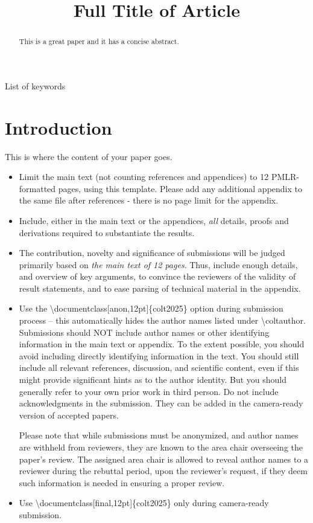 \documentclass[anon,12pt]{colt2025} %
\title[Short Title]{Full Title of Article}
\begin{document}
\maketitle

\begin{abstract}%
  This is a great paper and it has a concise abstract.%
\end{abstract}

\begin{keywords}%
  List of keywords%
\end{keywords}

\section{Introduction}

This is where the content of your paper goes.
\begin{itemize}
  \item Limit the main text (not counting references and appendices) to 12 PMLR-formatted pages, using this template. Please add any additional appendix to the same file after references - there is no page limit for the appendix.
  \item Include, either in the main text or the appendices, \emph{all} details, proofs and derivations required to substantiate the results.
  \item The contribution, novelty and significance of submissions will be judged primarily based on
\textit{the main text of 12 pages}. Thus, include enough details, and overview of key arguments, 
to convince the reviewers of the validity of result statements, and to ease parsing of technical material in the appendix.
  \item Use the \textbackslash documentclass[anon,12pt]\{colt2025\} option during submission process -- this automatically hides the author names listed under \textbackslash coltauthor. Submissions should NOT include author names or other identifying information in the main text or appendix. To the extent possible, you should avoid including directly identifying information in the text. You should still include all relevant references, discussion, and scientific content, even if this might provide significant hints as to the author identity. But you should generally refer to your own prior work in third person. Do not include acknowledgments in the submission. They can be added in the camera-ready version of accepted papers. 
  
  Please note that while submissions must be anonymized, and author names are withheld from reviewers, they are known to the area chair overseeing the paper’s review.  The assigned area chair is allowed to reveal author names to a reviewer during the rebuttal period, upon the reviewer’s request, if they deem such information is needed in ensuring a proper review.  
  \item Use \textbackslash documentclass[final,12pt]\{colt2025\} only during camera-ready submission.
\end{itemize}
\end{document}
